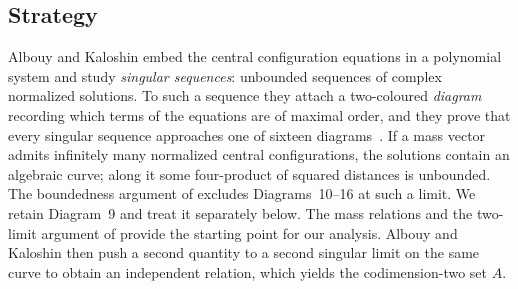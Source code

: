 \documentclass[11pt]{amsart}
\theoremstyle{definition}
\theoremstyle{remark}
\begin{document}
\subsection*{Strategy}
Albouy and Kaloshin embed the central configuration equations in a polynomial system and
study \emph{singular sequences}: unbounded sequences of complex normalized solutions.  To such a
sequence they attach a two-coloured \emph{diagram} recording which terms of the equations are
of maximal order, and they prove that every singular sequence approaches one of sixteen
diagrams~\cite[Fig.~11]{AK}.  If a mass vector admits infinitely many normalized central
configurations, the solutions contain an algebraic curve; along it some four-product of squared
distances is unbounded.  The boundedness argument of \cite[Prop.~8]{AK} excludes
Diagrams~10--16 at such a limit.  We retain Diagram~9 and treat it separately below.
The mass relations and the two-limit argument of \cite[\S\S8--9]{AK} provide the starting point
for our analysis.  Albouy and Kaloshin then push a second quantity to a second singular
limit on the same curve to obtain an independent relation, which yields the codimension-two set
$A$.
\end{document}
